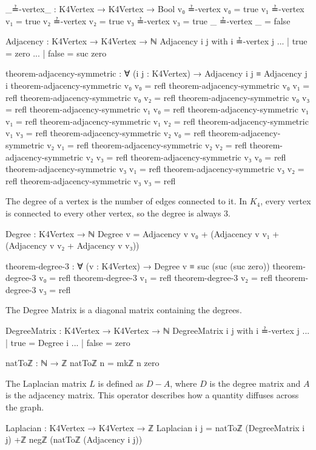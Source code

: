 \documentclass[11pt,a4paper]{book}
\begin{document}
\begin{code}
_≟-vertex_ : K4Vertex → K4Vertex → Bool
v₀ ≟-vertex v₀ = true
v₁ ≟-vertex v₁ = true
v₂ ≟-vertex v₂ = true
v₃ ≟-vertex v₃ = true
_  ≟-vertex _  = false

Adjacency : K4Vertex → K4Vertex → ℕ
Adjacency i j with i ≟-vertex j
... | true  = zero
... | false = suc zero

theorem-adjacency-symmetric : ∀ (i j : K4Vertex) → Adjacency i j ≡ Adjacency j i
theorem-adjacency-symmetric v₀ v₀ = refl
theorem-adjacency-symmetric v₀ v₁ = refl
theorem-adjacency-symmetric v₀ v₂ = refl
theorem-adjacency-symmetric v₀ v₃ = refl
theorem-adjacency-symmetric v₁ v₀ = refl
theorem-adjacency-symmetric v₁ v₁ = refl
theorem-adjacency-symmetric v₁ v₂ = refl
theorem-adjacency-symmetric v₁ v₃ = refl
theorem-adjacency-symmetric v₂ v₀ = refl
theorem-adjacency-symmetric v₂ v₁ = refl
theorem-adjacency-symmetric v₂ v₂ = refl
theorem-adjacency-symmetric v₂ v₃ = refl
theorem-adjacency-symmetric v₃ v₀ = refl
theorem-adjacency-symmetric v₃ v₁ = refl
theorem-adjacency-symmetric v₃ v₂ = refl
theorem-adjacency-symmetric v₃ v₃ = refl
\end{code}

The degree of a vertex is the number of edges connected to it. In $K_4$, every vertex is connected to every other vertex, so the degree is always 3.

\begin{code}
Degree : K4Vertex → ℕ
Degree v = Adjacency v v₀ + (Adjacency v v₁ + (Adjacency v v₂ + Adjacency v v₃))

theorem-degree-3 : ∀ (v : K4Vertex) → Degree v ≡ suc (suc (suc zero))
theorem-degree-3 v₀ = refl
theorem-degree-3 v₁ = refl
theorem-degree-3 v₂ = refl
theorem-degree-3 v₃ = refl
\end{code}

The Degree Matrix is a diagonal matrix containing the degrees.

\begin{code}
DegreeMatrix : K4Vertex → K4Vertex → ℕ
DegreeMatrix i j with i ≟-vertex j
... | true  = Degree i
... | false = zero

natToℤ : ℕ → ℤ
natToℤ n = mkℤ n zero
\end{code}

The Laplacian matrix $L$ is defined as $D - A$, where $D$ is the degree matrix and $A$ is the adjacency matrix. This operator describes how a quantity diffuses across the graph.

\begin{code}
Laplacian : K4Vertex → K4Vertex → ℤ
Laplacian i j = natToℤ (DegreeMatrix i j) +ℤ negℤ (natToℤ (Adjacency i j))
\end{code}
\end{document}
